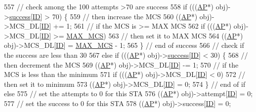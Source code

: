 \begin{DoxyCode}
{557                 \textcolor{comment}{// check among the 100 attempts >70 are success}
558                 \textcolor{keywordflow}{if} (((\hyperlink{classAP}{AP}*) obj)->\hyperlink{classSTA_a8f2d6be8326b3e46fbf1599040bff750}{success}[\hyperlink{classSTA_a9376abb50969b5b16aeb5fb0e449e6f7}{ID}] > 70) \{
559                     \textcolor{comment}{// then increase the MCS}
560                     ((\hyperlink{classAP}{AP}*) obj)->MCS\_DL[\hyperlink{classSTA_a9376abb50969b5b16aeb5fb0e449e6f7}{ID}] += 1;
561                     \textcolor{comment}{// if the MCS is >= MAX MCS}
562                     \textcolor{keywordflow}{if} (((\hyperlink{classAP}{AP}*) obj)->MCS\_DL[\hyperlink{classSTA_a9376abb50969b5b16aeb5fb0e449e6f7}{ID}] >= \hyperlink{classSTA_a5c5df3db89aa13fc409c4c0d6f8924d2}{MAX\_MCS})
563                         \textcolor{comment}{// then set it to MAX MCS}
564                         ((\hyperlink{classAP}{AP}*) obj)->MCS\_DL[\hyperlink{classSTA_a9376abb50969b5b16aeb5fb0e449e6f7}{ID}] = \hyperlink{classSTA_a5c5df3db89aa13fc409c4c0d6f8924d2}{MAX\_MCS} - 1;
565                 \} \textcolor{comment}{// end of success}
566                   \textcolor{comment}{// check if the success are less than 30%
567                 \textcolor{keywordflow}{else} \textcolor{keywordflow}{if} (((\hyperlink{classAP}{AP}*) obj)->\hyperlink{classSTA_a8f2d6be8326b3e46fbf1599040bff750}{success}[\hyperlink{classSTA_a9376abb50969b5b16aeb5fb0e449e6f7}{ID}] < 30) \{
568                     \textcolor{comment}{// then decrement the MCS}
569                     ((\hyperlink{classAP}{AP}*) obj)->MCS\_DL[\hyperlink{classSTA_a9376abb50969b5b16aeb5fb0e449e6f7}{ID}] -= 1;
570                     \textcolor{comment}{// if the MCS is less than the minimum}
571                     \textcolor{keywordflow}{if} (((\hyperlink{classAP}{AP}*) obj)->MCS\_DL[\hyperlink{classSTA_a9376abb50969b5b16aeb5fb0e449e6f7}{ID}] < 0)
572                         \textcolor{comment}{// then set it to minimum}
573                         ((\hyperlink{classAP}{AP}*) obj)->MCS\_DL[\hyperlink{classSTA_a9376abb50969b5b16aeb5fb0e449e6f7}{ID}] = 0;
574                 \} \textcolor{comment}{// end of if else}
575                   \textcolor{comment}{// set the attempts to 0 for this STA     }
576                 ((\hyperlink{classAP}{AP}*) obj)->attempt[\hyperlink{classSTA_a9376abb50969b5b16aeb5fb0e449e6f7}{ID}] = 0;
577                 \textcolor{comment}{// set the success to 0 for this STA}
578                 ((\hyperlink{classAP}{AP}*) obj)->success[\hyperlink{classSTA_a9376abb50969b5b16aeb5fb0e449e6f7}{ID}] = 0;
}}
\end{DoxyCode}

